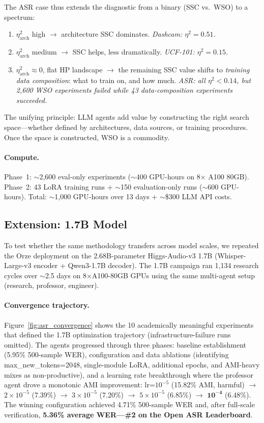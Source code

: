 \documentclass{article}
\begin{document}
The ASR case thus extends the diagnostic from a binary (SSC vs.\ WSO) to a spectrum:

\begin{enumerate}[leftmargin=*, itemsep=1pt]
\item $\eta^2_{\mathrm{arch}}$ high $\to$ architecture SSC dominates. \emph{Dashcam: $\eta^2 = 0.51$.}
\item $\eta^2_{\mathrm{arch}}$ medium $\to$ SSC helps, less dramatically. \emph{UCF-101: $\eta^2 = 0.15$.}
\item $\eta^2_{\mathrm{arch}} \approx 0$, flat HP landscape $\to$ the remaining SSC value shifts to \emph{training data composition}: what to train on, and how much. \emph{ASR: all $\eta^2 < 0.14$, but 2{,}600 WSO experiments failed while 43 data-composition experiments succeeded.}
\end{enumerate}

The unifying principle: LLM agents add value by constructing the right search space---whether defined by architectures, data sources, or training procedures.
Once the space is constructed, WSO is a commodity.

\paragraph{Compute.}
Phase~1: $\sim$2{,}600 eval-only experiments ($\sim$400 GPU-hours on 8$\times$ A100 80GB).
Phase~2: 43 LoRA training runs + $\sim$150 evaluation-only runs ($\sim$600 GPU-hours).
Total: $\sim$1{,}000 GPU-hours over 13 days + $\sim$\$300 LLM API costs.

\subsection*{Extension: 1.7B Model}
\label{app:asr_1_7b}

To test whether the same methodology transfers across model scales, we repeated the Orze deployment on the 2.68B-parameter Higgs-Audio-v3 1.7B (Whisper-Large-v3 encoder + Qwen3-1.7B decoder). The 1.7B campaign ran 1{,}134 research cycles over $\sim$2.5 days on 8$\times$A100-80GB GPUs using the same multi-agent setup (research, professor, engineer).

\paragraph{Convergence trajectory.}
Figure~\ref{fig:asr_convergence} shows the 10 academically meaningful experiments that defined the 1.7B optimization trajectory (infrastructure-failure runs omitted). The agents progressed through three phases: baseline establishment (5.95\% 500-sample WER), configuration and data ablations (identifying max\_new\_tokens=2048, single-module LoRA, additional epochs, and AMI-heavy mixes as non-productive), and a learning rate breakthrough where the professor agent drove a monotonic AMI improvement: lr=$10^{-5}$ (15.82\% AMI, harmful) $\to$ $2\!\times\!10^{-5}$ (7.39\%) $\to$ $3\!\times\!10^{-5}$ (7.20\%) $\to$ $5\!\times\!10^{-5}$ (6.85\%) $\to$ $\mathbf{10^{-4}}$ (6.48\%). The winning configuration achieved 4.71\% 500-sample WER and, after full-scale verification, \textbf{5.36\% average WER---\#2 on the Open ASR Leaderboard}.
\end{document}
